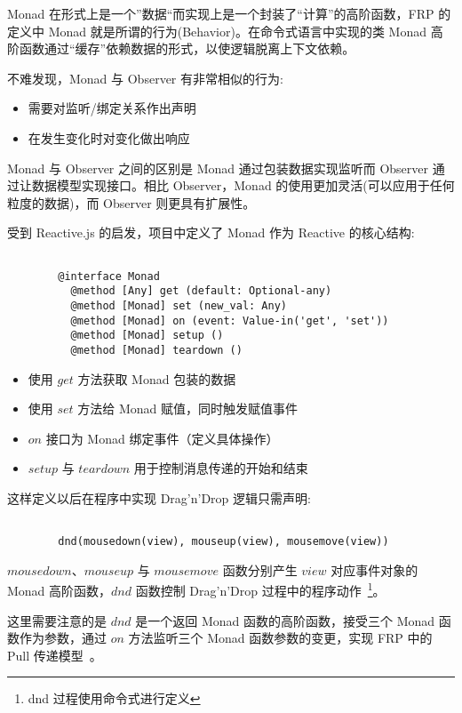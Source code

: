 Monad 在形式上是一个”数据“而实现上是一个封装了“计算”的高阶函数，FRP 的定义中 Monad 就是所谓的行为(Behavior)。在命令式语言中实现的类 Monad 高阶函数通过“缓存”依赖数据的形式，以使逻辑脱离上下文依赖。

不难发现，Monad 与 Observer 有非常相似的行为:

\begin{itemize}
  \item 需要对监听/绑定关系作出声明
  \item 在发生变化时对变化做出响应
\end{itemize}

Monad 与 Observer 之间的区别是 Monad 通过包装数据实现监听而 Observer 通过让数据模型实现接口。相比 Observer，Monad 的使用更加灵活(可以应用于任何粒度的数据)，而 Observer 则更具有扩展性。

受到 Reactive.js 的启发，项目中定义了 Monad 作为 Reactive 的核心结构:

\begin{verbatim}

        @interface Monad
          @method [Any] get (default: Optional-any)
          @method [Monad] set (new_val: Any)
          @method [Monad] on (event: Value-in('get', 'set'))
          @method [Monad] setup ()
          @method [Monad] teardown ()

\end{verbatim}

\begin{itemize}
  \item 使用 $get$ 方法获取 Monad 包装的数据
  \item 使用 $set$ 方法给 Monad 赋值，同时触发赋值事件
  \item $on$ 接口为 Monad 绑定事件（定义具体操作）
  \item $setup$ 与 $teardown$ 用于控制消息传递的开始和结束
\end{itemize}

这样定义以后在程序中实现 Drag'n'Drop 逻辑只需声明:

\begin{verbatim}

        dnd(mousedown(view), mouseup(view), mousemove(view))

\end{verbatim}

$mousedown$、$mouseup$ 与 $mousemove$ 函数分别产生 $view$ 对应事件对象的 Monad 高阶函数，$dnd$ 函数控制 Drag'n'Drop 过程中的程序动作~\footnote{dnd 过程使用命令式进行定义}。

这里需要注意的是 $dnd$ 是一个返回 Monad 函数的高阶函数，接受三个 Monad 函数作为参数，通过 $on$ 方法监听三个 Monad 函数参数的变更，实现 FRP 中的 Pull 传递模型~\cite{Elliott:2009:PFR:1596638.1596643}。

